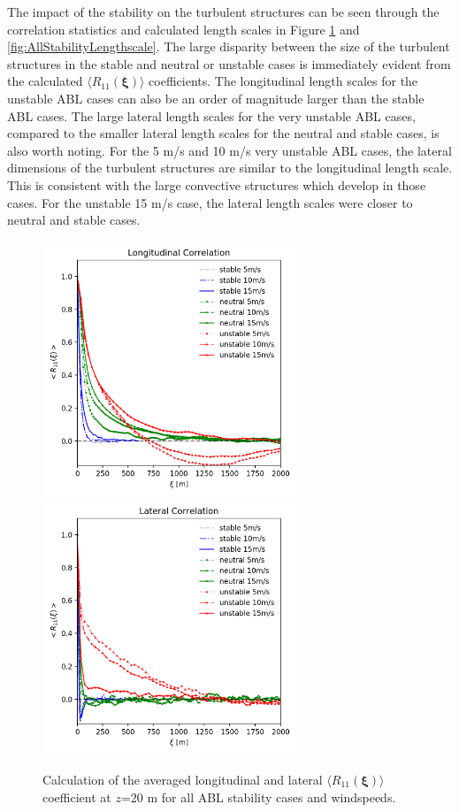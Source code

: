 The impact of the stability on the turbulent structures can be seen
through the correlation statistics and calculated length scales in
Figure \ref{fig:AllStabilityRij} and
\ref{fig:AllStabilityLengthscale}.  The large disparity between the
size of the turbulent structures in the stable and neutral or unstable
cases is immediately evident from the calculated $\langle
R_{11}(\boldsymbol{\xi})\rangle$ coefficients.  The longitudinal
length scales for the unstable ABL cases can also be an order of
magnitude larger than the stable ABL cases.  The large lateral
length scales for the very unstable ABL cases, compared to the smaller lateral
length scales for the neutral and stable cases, is also worth noting.
For the 5 m/s and 10 m/s very unstable ABL cases, the lateral
dimensions of the turbulent structures are similar to the longitudinal
length scale.  This is consistent with the large convective structures
which develop in those cases.  For the unstable 15 m/s case, the
lateral length scales were closer to neutral and stable cases.

\begin{figure}[hbt!]
  \centering
  \includegraphics[width=3in]{figures/AllStability_Rij_Longitudinal.png}
  \includegraphics[width=3in]{figures/AllStability_Rij_Lateral.png}
  \caption{ \label{fig:AllStabilityRij} Calculation of the averaged
    longitudinal and lateral $\langle R_{11}(\boldsymbol{\xi})\rangle$
    coefficient at $z$=20 m for all ABL stability cases and windspeeds.}
\end{figure}

